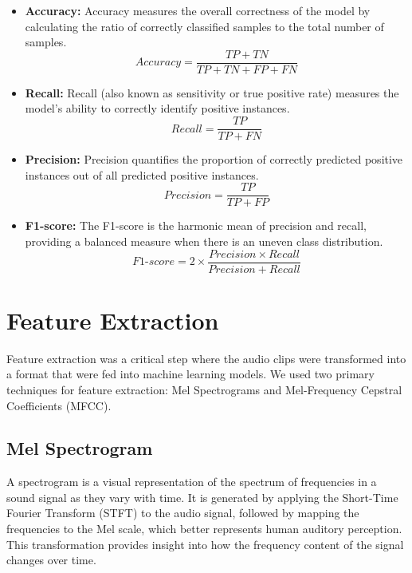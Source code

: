         \begin{itemize}
            \item \textbf{Accuracy:}  
            Accuracy measures the overall correctness of the model by calculating the ratio of correctly classified samples to the total number of samples.
            \begin{equation}
                Accuracy = \frac{TP + TN}{TP + TN + FP + FN}
            \end{equation}
        
            \item \textbf{Recall:}  
            Recall (also known as sensitivity or true positive rate) measures the model's ability to correctly identify positive instances.
            \begin{equation}
                Recall = \frac{TP}{TP + FN}
            \end{equation}
        
            \item \textbf{Precision:}  
            Precision quantifies the proportion of correctly predicted positive instances out of all predicted positive instances.
            \begin{equation}
                Precision = \frac{TP}{TP + FP}
            \end{equation}
        
            \item \textbf{F1-score:}  
            The F1-score is the harmonic mean of precision and recall, providing a balanced measure when there is an uneven class distribution.
            \begin{equation}
                F1\text{-}score = 2 \times \frac{Precision \times Recall}{Precision + Recall}
            \end{equation}
        
        \end{itemize}
      

\section{Feature Extraction}
\label{sec:feature_extraction} 
Feature extraction was a critical step where the audio clips were transformed
into a format that were fed into machine learning models. We used two primary
techniques for feature extraction: Mel Spectrograms and Mel-Frequency Cepstral
Coefficients (MFCC).

      \subsection{Mel Spectrogram}
      A spectrogram is a visual representation of the spectrum of frequencies in a
      sound signal as they vary with time. It is generated by applying the Short-Time Fourier Transform (STFT) to the audio signal, followed by mapping the frequencies to the Mel scale, which better represents human auditory perception. This transformation provides
      insight into how the frequency content of the signal changes over time.

